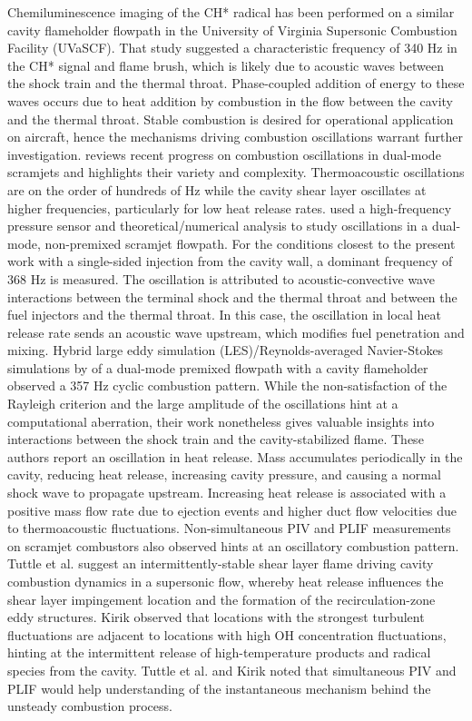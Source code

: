 Chemiluminescence imaging of the CH* radical has been performed \cite{AllisonFredericksonKirikEtAl2017}  on a similar cavity flameholder flowpath in the University of Virginia Supersonic Combustion Facility (UVaSCF). That study suggested a characteristic frequency of 340 Hz in the CH* signal and flame brush, which is likely due to acoustic waves between the shock train and the thermal throat. Phase-coupled addition of energy to these waves occurs due to heat addition by combustion in the flow between the cavity and the thermal throat. 
Stable combustion is desired for operational application on aircraft, hence the mechanisms driving combustion oscillations warrant further investigation.
\citet{WangWangSun2014} reviews recent progress on combustion oscillations in dual-mode scramjets and highlights their variety and complexity. Thermoacoustic oscillations are on the order of hundreds of Hz while the cavity shear layer oscillates at higher frequencies, particularly for low heat release rates.  
\citet{LinJacksonBehdadniaEtAl2010} used a high-frequency pressure sensor and theoretical/numerical analysis to study oscillations in a dual-mode, non-premixed scramjet flowpath. For the conditions closest to the present work with a single-sided injection from the cavity wall, a dominant frequency of 368 Hz is measured. The oscillation is attributed to acoustic-convective wave interactions between the terminal shock and the thermal throat and between the fuel injectors and the thermal throat. In this case, the oscillation in local heat release rate sends an acoustic wave upstream, which modifies fuel penetration and mixing. 
Hybrid large eddy simulation (LES)/Reynolds-averaged Navier-Stokes simulations by \citet{ramesh2015large} of a dual-mode premixed flowpath with a cavity flameholder observed a 357 Hz cyclic combustion pattern. While the non-satisfaction of the Rayleigh criterion and the large amplitude of the oscillations hint at a computational aberration, their work nonetheless gives valuable insights into interactions between the shock train and the cavity-stabilized flame. These authors report an oscillation in heat release. Mass accumulates periodically in the cavity, reducing heat release, increasing cavity pressure, and causing a normal shock wave to propagate upstream. Increasing heat release is associated with a positive mass flow rate due to ejection events and higher duct flow velocities due to thermoacoustic fluctuations.
Non-simultaneous PIV and PLIF measurements on scramjet combustors also observed hints at an oscillatory combustion pattern. 
Tuttle et al. \cite{TuttleCarterHsu2014} suggest an intermittently-stable shear layer flame driving cavity combustion dynamics in a supersonic flow, whereby heat release influences the shear layer impingement location and the formation of the recirculation-zone eddy structures.
Kirik \cite{Kirik2017} observed that locations with the strongest turbulent fluctuations are adjacent to locations with high OH concentration fluctuations, hinting at the intermittent release of high-temperature products and radical species from the cavity.  
Tuttle et al. \cite{TuttleCarterHsu2014} and Kirik \cite{Kirik2017} noted that simultaneous PIV and PLIF would help understanding of the instantaneous mechanism behind the unsteady combustion process. 


